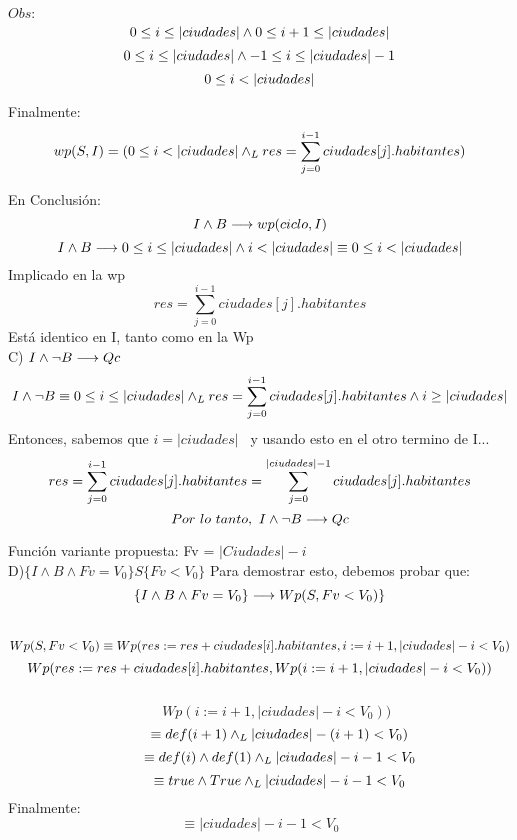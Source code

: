\documentclass[10pt,a4paper]{article}
\begin{document}
\hspace{1cm}$Obs:$\\ 
\[0 \leq i \leq |ciudades| \land 0 \leq i+1 \leq |ciudades|\\  \]
\[0 \leq i \leq |ciudades| \land -1 \leq i \leq |ciudades|-1\\\]
\[0 \leq i < |ciudades|\\ \]

\hspace{1cm} Finalmente:
\[wp(S,I)=(0 \leq i < |ciudades| \land _L res = {\sum\limits_{j=0}^{i-1}ciudades[j].habitantes})\\\]
	
\hspace{1cm} En Conclusión:\\
\[I \land B \longrightarrow wp(ciclo,I)\]
\[I \land B \implica 0 \leq i \leq |ciudades| \land i<|ciudades| \equiv 0 \leq i < |ciudades|\]
Implicado en la wp\\
\[res = \sum\limits_{j=0}^{i-1}ciudades[j].habitantes\]
Está identico en I, tanto como en la Wp
\vspace{0.5cm}\\


C) $I \land \neg B \longrightarrow Qc$\\
\[I \land \neg B \equiv 0 \leq i \leq |ciudades| \land _L res ={\sum\limits_{j=0}^{i-1}ciudades[j].habitantes} \land i \geq |ciudades|\]
\hspace{1cm}Entonces, sabemos que $i=|ciudades|$ \ y usando esto en el otro termino de I...
\[res = {\sum\limits_{j=0}^{i-1}ciudades[j].habitantes} = {\sum\limits_{j=0}^{|ciudades|-1}ciudades[j].habitantes}\\ \\\]
\[Por \ lo \ tanto, \ I\land \neg B \implica Qc\\ \vspace{0.5cm}\\\]

Función variante propuesta: Fv = $|Ciudades|-i$ \\

D)$\{I \land B \land Fv = V_0\} S \{Fv < V_0\}$ Para demostrar esto, debemos probar que: \\
\[\{I \land B \land Fv = V_0\} \longrightarrow Wp (S, Fv < V_0 )\}\]
\\
\[Wp(S,Fv < V_0 ) \equiv Wp(res:=res+ciudades[i].habitantes, i:=i+1,|ciudades|-i<V_0)\\ \]
\[Wp(res:= res+ciudades[i].habitantes, Wp(i:=i+1,|ciudades|-i< V_0))\\\] \\
\[\hspace{1cm}Wp(i:=i+1,|ciudades|-i<V_0))  \]
\[\hspace{1cm}\equiv def (i+1) \land _L |ciudades|-(i+1) < V_0 )\]
\[\hspace{1cm}\equiv def(i) \land def(1) \land _L |ciudades|-i-1 < V_0 \]
\[\hspace{1cm}\equiv true \land True \land _L |ciudades|-i-1 < V_0  \]
\hspace{1cm}Finalmente:
\[\equiv |ciudades| -i-1 < V_0\]
\end{document}
